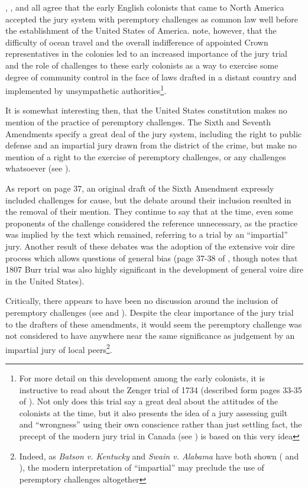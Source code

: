 \cite{vonmosch1921}, \cite{hoffman1997}, and \cite{vandykejurysel} all agree that the early English colonists that came to North
America accepted the jury system with peremptory challenges as common law well before the establishment of the United States of
America. \cite{hansvidjudging} note, however, that the difficulty of ocean travel and the overall indifference of appointed Crown
representatives in the colonies led to an increased importance of the jury trial and the role of challenges to these early
colonists as a way to exercise some degree of community control in the face of laws drafted in a distant country and implemented
by unsympathetic authorities\footnote{For more detail on this development among the early colonists, it is instructive to read
  about the Zenger trial of 1734 (described form pages 33-35 of \cite{hansvidjudging}). Not only does this trial say a great deal
  about the attitudes of the colonists at the time, but it also presents the idea of a jury assessing guilt and ``wrongness''
  using their own conscience rather than just settling fact, the precept of the modern jury trial in Canada (see
  \cite{woolley2018}) is based on this very idea}.

It is somewhat interesting then, that the United States constitution makes no mention of the practice of peremptory
challenges. The Sixth and Seventh Amendments specify a great deal of the jury system, including the right to public defense and an
impartial jury drawn from the district of the crime, but make no mention of a right to the exercise of peremptory challenges, or
any challenges whatsoever (see \cite{usconstitution}).

As \cite{hansvidjudging} report on page 37, an original draft of the Sixth Amendment expressly included challenges for cause, but
the debate around their inclusion resulted in the removal of their mention. They continue to say that at the time, even some
proponents of the challenge considered the reference unnecessary, as the practice was implied by the text which remained,
referring to a trial by an ``impartial'' jury. Another result of these debates was the adoption of the extensive voir dire process
which allows questions of general bias (page 37-38 of \cite{hansvidjudging}, though \cite{brown2000} notes that 1807 Burr trial
was also highly significant in the development of general voire dire in the United States).

Critically, there appears to have been no discussion around the inclusion of peremptory challenges (see \cite{hansvidjudging} and
\cite{hoffman1997}). Despite the clear importance of the jury trial to the drafters of these amendments, it would seem the
peremptory challenge was not considered to have anywhere near the same significance as judgement by an impartial jury of local
peers\footnote{Indeed, as \textit{Batson v. Kentucky} and \textit{Swain v. Alabama} have both shown (\cite{batsonvkentucky} and
  \cite{swainvalabama}), the modern interpretation of ``impartial'' may preclude the use of peremptory challenges
  altogether}.

